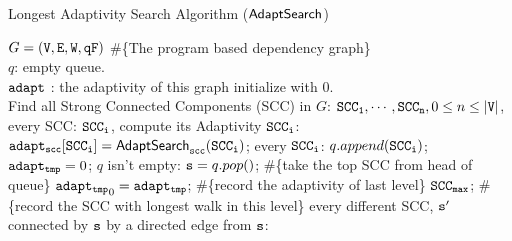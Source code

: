 \begin{algorithm}
    \caption{
    {Longest Adaptivity Search Algorithm ($\mathsf{AdaptSearch}$)}
    \label{alg:adpt_alg}
    }
    \begin{algorithmic}[1]
    \REQUIRE $G = (\mathtt{V}, \mathtt{E}, \mathtt{W}, \mathtt{qF})$ \#\{The program based dependency graph\}
    \\
    $q$: empty queue.
    \\
    $\mathtt{adapt}$ : the adaptivity of this graph initialize with $0$.
    \\
    \STATE Find all Strong Connected Components (SCC) in $G$: $\mathtt{SCC_1}, \cdots, \mathtt{SCC_n}, 0 \leq n \leq |\mathtt{V}|$, 
     every SCC: $\mathtt{SCC_i}$, compute its Adaptivity $\mathtt{SCC_i}$:
    \STATE \quad $\mathtt{adapt_{scc}[SCC_i] = \mathsf{AdaptSearch}_{scc}(SCC_i)}$;
     every $\mathtt{SCC_i}$:
    \STATE \qquad $q.append(\mathtt{SCC_i})$;
    \STATE \qquad $\mathtt{adapt_{tmp}} = 0$;
    \STATE {} $q$ isn't empty:
    \STATE \qquad \qquad $\mathtt{s} = q.pop()$;  \#\{take the top SCC from head of queue\}
    \STATE \qquad \qquad  $\mathtt{adapt_{tmp}}_0= \mathtt{adapt_{tmp}}$; \#\{record the adaptivity of last level\}
    \STATE \qquad \qquad  $\mathtt{SCC_{max}}$;  \#\{record the SCC with longest walk in this level\}
    \STATE \qquad {} every 
    different SCC, $\mathtt{s'}$ connected by $\mathtt{s}$ by a directed edge from $\mathtt{s}$:

\end{algorithmic}
\end{algorithm}
